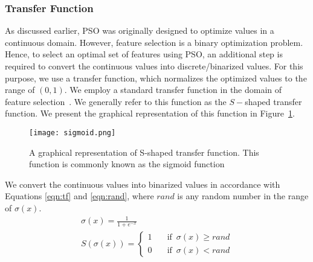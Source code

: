 \documentclass[final,3p,times]{elsarticle}
\begin{document}
\subsubsection{Transfer Function}
As discussed earlier, PSO was originally designed to optimize values in a continuous domain. However, feature selection is a binary optimization problem. Hence, to select an optimal set of features using PSO, an additional step is required to convert the continuous values into {discrete/binarized values.} For this purpose, we use a transfer function, which normalizes the optimized values to the range of $(0,1)$. We employ a standard transfer function in the domain of feature selection~\cite{chattopadhyay2021Pneumonia,ahmed2022binary}. {We generally refer to this} function as the $S-$shaped transfer {function. We present} the graphical representation of this function in Figure~\ref{fig:transfer}.
\begin{figure}
    \centering
    \texttt{[image: sigmoid.png]}
    \caption{A graphical representation of S-shaped transfer function. This function is commonly known as the sigmoid function}
    \label{fig:transfer}
\end{figure}
We convert the continuous values into binarized values in accordance with Equations \ref{eqn:tf} and \ref{eqn:rand}, where $rand$ is any random number in the range of $\sigma(x)$.
\begin{gather}
    \label{eqn:tf}
    \sigma (x)= \frac{1}{1+e^{-x}}\\
        \label{eqn:rand}
    S(\sigma (x)) = \begin{cases}
          1 \quad &\text{if } \, \sigma (x) \geq rand \\
          0\quad &\text{if } \, \sigma (x) < rand
     \end{cases}
\end{gather}
\end{document}
